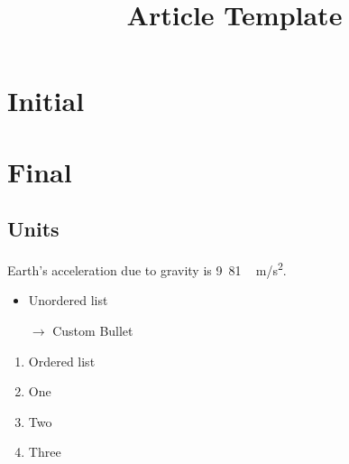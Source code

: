 \documentclass[11pt]{article}
\title{Article Template}
\author{}
\begin{document}

\maketitle

\section{Initial}

\lipsum[1-3]

\section{Final}

\lipsum[45]

\subsection{Units}

Earth's acceleration due to gravity is \unit{9.81\,m/s^{2}}.

\begin{itemize}[leftmargin={0.085\textwidth}]
    \item{Unordered list}
    \item[$\rightarrow$]{Custom Bullet}
\end{itemize}

\begin{enumerate}[leftmargin={0.085\textwidth}]
    \item {Ordered list}
    \item {One}
    \item {Two}
    \item {Three}
\end{enumerate}

\end{document}
